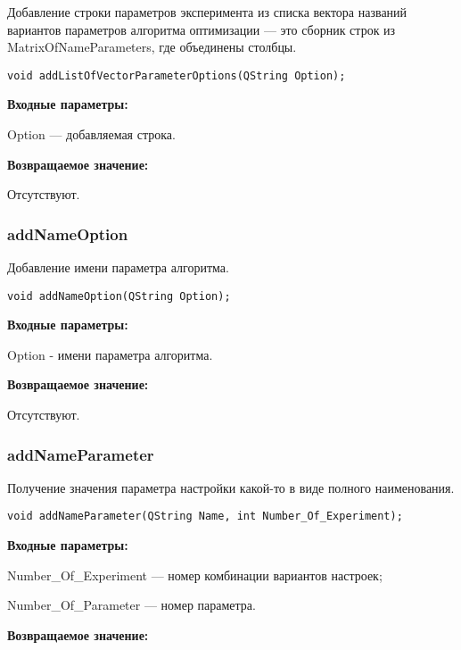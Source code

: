 \documentclass[a4paper,12pt]{article}
\begin{document}
Добавление строки параметров эксперимента из списка вектора названий вариантов параметров алгоритма оптимизации --- это сборник строк из MatrixOfNameParameters, где объединены столбцы.


\begin{lstlisting}[label=code_syntax_addListOfVectorParameterOptions,caption=Синтаксис]
void addListOfVectorParameterOptions(QString Option);
\end{lstlisting}

\textbf{Входные параметры:}

Option --- добавляемая строка.

\textbf{Возвращаемое значение:}

Отсутствуют.


\subsubsection{addNameOption}\label{addNameOption}

Добавление имени параметра алгоритма.


\begin{lstlisting}[label=code_syntax_addNameOption,caption=Синтаксис]
void addNameOption(QString Option);
\end{lstlisting}

\textbf{Входные параметры:}

Option - имени параметра алгоритма.

\textbf{Возвращаемое значение:}

Отсутствуют.


\subsubsection{addNameParameter}\label{addNameParameter}

Получение значения параметра настройки какой-то в виде полного наименования.


\begin{lstlisting}[label=code_syntax_addNameParameter,caption=Синтаксис]
void addNameParameter(QString Name, int Number_Of_Experiment);
\end{lstlisting}

\textbf{Входные параметры:}

Number\_Of\_Experiment --- номер комбинации вариантов настроек;
 
    Number\_Of\_Parameter --- номер параметра.

\textbf{Возвращаемое значение:}
\end{document}

